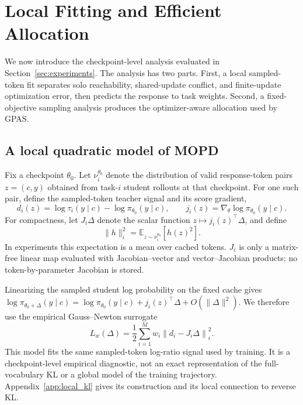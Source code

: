 \section{Local Fitting and Efficient Allocation}
\label{sec:theory}

We now introduce the checkpoint-level analysis evaluated in
Section~\ref{sec:experiments}. The analysis has two parts. First, a local
sampled-token fit separates solo reachability, shared-update conflict, and
finite-update optimization error, then predicts the response to task weights.
Second, a fixed-objective sampling analysis produces the optimizer-aware
allocation used by GPAS.


\subsection{A local quadratic model of MOPD}
\label{sec:local_fit}

Fix a checkpoint $\theta_0$. Let $\nu_i^{\theta_0}$ denote the distribution
of valid response-token pairs $z=(c,y)$ obtained from task-$i$ student
rollouts at that checkpoint. For one such pair, define the sampled-token
teacher signal and its score gradient,
\begin{equation}
    d_i(z)
    =\log\tau_i(y\mid c)-\log\pi_{\theta_0}(y\mid c),
    \qquad
    j_i(z)=\nabla_\theta\log\pi_{\theta_0}(y\mid c).
    \label{eq:local_logprob_terms}
\end{equation}
For compactness, let $J_i\Delta$ denote the scalar function
$z\mapsto j_i(z)^\top\Delta$, and define
\begin{equation}
    \|h\|_i^2
    =\mathbb E_{z\sim\nu_i^{\theta_0}}[h(z)^2].
    \label{eq:local_token_norm}
\end{equation}
In experiments this expectation is a mean over cached tokens. $J_i$ is only
a matrix-free linear map evaluated with Jacobian--vector and
vector--Jacobian products; no token-by-parameter Jacobian is stored.

Linearizing the sampled student log probability on the fixed cache gives
$\log\pi_{\theta_0+\Delta}(y\mid c)
=\log\pi_{\theta_0}(y\mid c)+j_i(z)^\top\Delta
+O(\|\Delta\|^2)$. We therefore use the empirical Gauss--Newton surrogate
\begin{equation}
    L_w(\Delta)
    =
    \frac12\sum_{i=1}^{M}w_i
    \left\|d_i-J_i\Delta\right\|_i^2.
    \label{eq:local_projection}
\end{equation}
This model fits the same sampled-token log-ratio signal used by training. It
is a checkpoint-level empirical diagnostic, not an exact representation of
the full-vocabulary KL or a global model of the training trajectory.
Appendix~\ref{app:local_kl} gives its construction and its local connection
to reverse KL.



